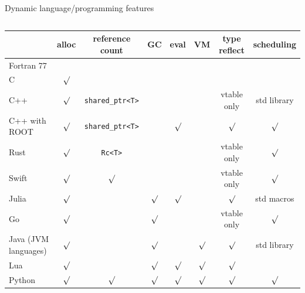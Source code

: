 \documentclass[aspectratio=169]{beamer}
\begin{document}
\begin{frame}{Dynamic language/programming features}
\begin{columns}
\begin{center}\renewcommand{\arraystretch}{1.25}
\begin{tabular}{l | c | c | c | c | c | c | c}
                     & alloc   & reference count              & GC      & eval    & VM      & type reflect & scheduling \\\hline
Fortran 77           &          &                                 &         &         &         &         &            \\
C                    & $\surd$  &                                 &         &         &         &         &            \\
C++                  & $\surd$  & {\small\texttt{shared_ptr<T>}} &         &         &         & vtable only  & std library \\
C++ with ROOT        & $\surd$  & {\small\texttt{shared_ptr<T>}} &         & $\surd$ &         & $\surd$ & $\surd$     \\
Rust                 & $\surd$  & {\small\texttt{Rc<T>}}         &         &         &         & vtable only  & $\surd$ \\
Swift                & $\surd$  & $\surd$                         &         &         &         & vtable only  & $\surd$     \\
Julia                & $\surd$  &                                 & $\surd$ & $\surd$ &         & $\surd$ & std macros  \\
Go                   & $\surd$  &                                 & $\surd$ &         &         & vtable only  & $\surd$     \\
Java (JVM languages) & $\surd$  &                                 & $\surd$ &         & $\surd$ & $\surd$ & std library \\
Lua                  & $\surd$  &                                 & $\surd$ & $\surd$ & $\surd$ & $\surd$ &             \\
Python               & $\surd$  & $\surd$                         & $\surd$ & $\surd$ & $\surd$ & $\surd$ & $\surd$     \\
\end{tabular}
\end{center}
\end{columns}
\end{frame}
\end{document}

